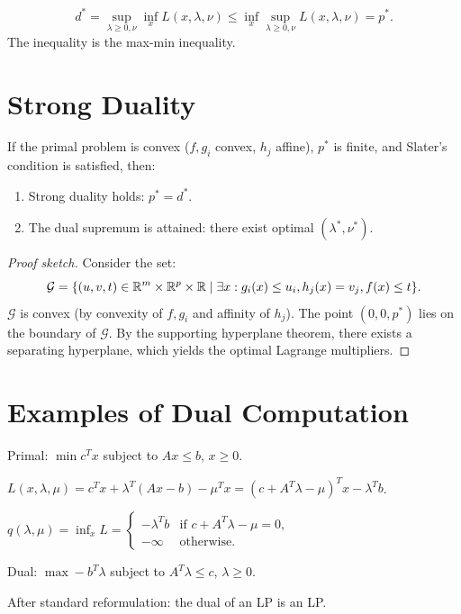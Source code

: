 \begin{keyformulas}[title=\textbf{Primal--Dual Relationship}]
\[
    d^* = \sup_{\lambda \geq 0, \nu} \inf_x L(x,\lambda,\nu)
    \leq \inf_x \sup_{\lambda \geq 0, \nu} L(x,\lambda,\nu) = p^*.
\]
The inequality is the max-min inequality.
\end{keyformulas}

\section{Strong Duality}

\begin{theorem}
\label{thm:slater}
If the primal problem is convex ($f, g_i$ convex, $h_j$ affine), $p^*$ is finite,
and Slater's condition is satisfied, then:
\begin{enumerate}
    \item Strong duality holds: $p^* = d^*$.
    \item The dual supremum is attained: there exist optimal $(\lambda^*, \nu^*)$.
\end{enumerate}
\end{theorem}

\begin{proof}[Proof sketch]
Consider the set:
\[
    \mathcal{G} = \{(u, v, t) \in \mathbb{R}^m \times \mathbb{R}^p \times \mathbb{R} \mid
    \exists x : g_i(x) \leq u_i, h_j(x) = v_j, f(x) \leq t\}.
\]
$\mathcal{G}$ is convex (by convexity of $f, g_i$ and affinity of $h_j$).
The point $(0, 0, p^*)$ lies on the boundary of $\mathcal{G}$. By the supporting
hyperplane theorem, there exists a separating hyperplane, which yields the optimal
Lagrange multipliers.
\end{proof}

\section{Examples of Dual Computation}

\begin{example}
Primal: $\min c^Tx$ subject to $Ax \leq b$, $x \geq 0$.

$L(x, \lambda, \mu) = c^Tx + \lambda^T(Ax - b) - \mu^Tx = (c + A^T\lambda - \mu)^Tx - \lambda^Tb$.

$q(\lambda, \mu) = \inf_x L = \begin{cases} -\lambda^Tb & \text{if } c + A^T\lambda - \mu = 0, \\ -\infty & \text{otherwise.}\end{cases}$

Dual: $\max -b^T\lambda$ subject to $A^T\lambda \leq c$, $\lambda \geq 0$.

After standard reformulation: the dual of an LP is an LP.
\end{example}

